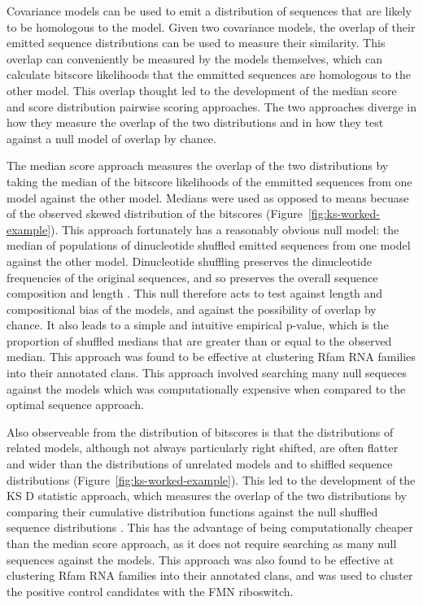 Covariance models can be used to emit a distribution of sequences that are likely to be homologous to the model.
Given two covariance models, the overlap of their emitted sequence distributions can be used to measure their similarity.
This overlap can conveniently be measured by the models themselves, which can calculate bitscore likelihoods that the emmitted sequences are homologous to the other model.
This overlap thought led to the development of the median score and score distribution pairwise scoring approaches.
The two approaches diverge in how they measure the overlap of the two distributions and in how they test against a null model of overlap by chance.

The median score approach measures the overlap of the two distributions by taking the median of the bitscore likelihoods of the emmitted sequences from one model against the other model.
Medians were used as opposed to means becuase of the observed skewed distribution of the bitscores (Figure~\ref{fig:ks-worked-example}).
This approach fortunately has a reasonably obvious null model: the median of populations of dinucleotide shuffled emitted sequences from one model against the other model.
Dinucleotide shuffling preserves the dinucleotide frequencies of the original sequences, and so preserves the overall sequence composition and length \citep{Altschul1985}.
This null therefore acts to test against length and compositional bias of the models, and against the possibility of overlap by chance.
It also leads to a simple and intuitive empirical p-value, which is the proportion of shuffled medians that are greater than or equal to the observed median.
This approach was found to be effective at clustering Rfam RNA families into their annotated clans.
This approach involved searching many null sequeces against the models which was computationally expensive when compared to the optimal sequence approach.

Also observeable from the distribution of bitscores is that the distributions of related models, although not always particularly right shifted, are often flatter and wider than the distributions of unrelated models and to shiffled sequence distributions (Figure~\ref{fig:ks-worked-example}).
This led to the development of the \ac{KS} D statistic approach, which measures the overlap of the two distributions by comparing their cumulative distribution functions against the null shuffled sequence distributions \citep{Smirnov1939}.
This has the advantage of being computationally cheaper than the median score approach, as it does not require searching as many null sequences against the models.
This approach was also found to be effective at clustering Rfam RNA families into their annotated clans, and was used to cluster the positive control candidates with the \ac{FMN} riboswitch.


